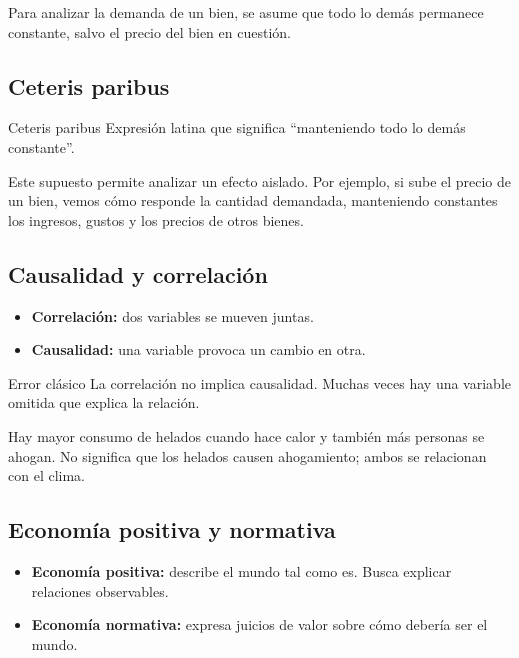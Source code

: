 \begin{ejemplo}
Para analizar la demanda de un bien, se asume que todo lo demás permanece constante, salvo el precio del bien en cuestión.
\end{ejemplo}

\subsection{Ceteris paribus}

\begin{concepto}{Ceteris paribus}
Expresión latina que significa “manteniendo todo lo demás constante”.
\end{concepto}

Este supuesto permite analizar un efecto aislado. Por ejemplo, si sube el precio de un bien, vemos cómo responde la cantidad demandada, manteniendo constantes los ingresos, gustos y los precios de otros bienes.

\subsection{Causalidad y correlación}

\begin{itemize}
    \item \textbf{Correlación:} dos variables se mueven juntas.
    \item \textbf{Causalidad:} una variable provoca un cambio en otra.
\end{itemize}

\begin{advertencia}{Error clásico}
La correlación no implica causalidad. Muchas veces hay una variable omitida que explica la relación.
\end{advertencia}

\begin{ejemplo}
Hay mayor consumo de helados cuando hace calor y también más personas se ahogan. No significa que los helados causen ahogamiento; ambos se relacionan con el clima.
\end{ejemplo}

\subsection{Economía positiva y normativa}

\begin{itemize}
    \item \textbf{Economía positiva:} describe el mundo tal como es. Busca explicar relaciones observables.
    \item \textbf{Economía normativa:} expresa juicios de valor sobre cómo debería ser el mundo.
\end{itemize}

